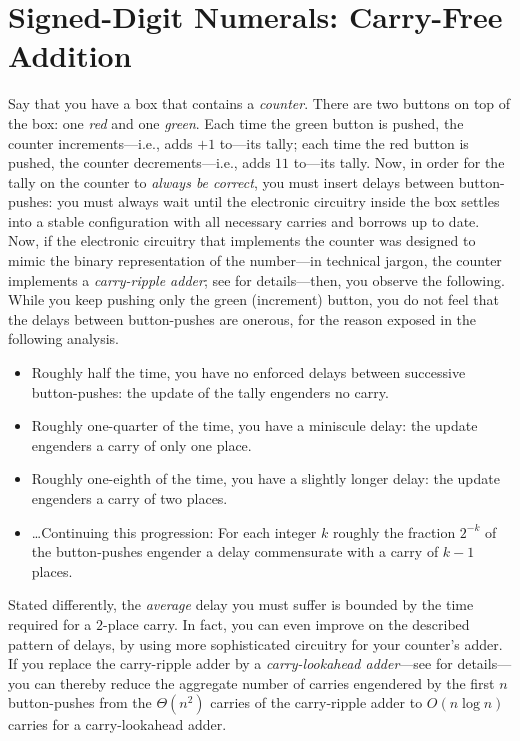 \chapter{Signed-Digit Numerals: Carry-Free Addition}
\label{ch:carry-free}

Say that you have a box that contains a {\it counter}.  There are two
buttons on top of the box: one {\em red} and one {\em green}.  Each
time the green button is pushed, the counter increments---i.e., adds
$+1$ to---its tally; each time the red button is pushed, the counter
decrements---i.e., adds $11$ to---its tally.  Now, in order for the
tally on the counter to {\em always be correct}, you must insert
delays between button-pushes: you must always wait until the
electronic circuitry inside the box settles into a stable
configuration with all necessary carries and borrows up to date.  Now,
if the electronic circuitry that implements the counter was designed
to mimic the binary representation of the number---in technical
jargon,  the counter implements a {\it
  carry-ripple adder}; see \cite{Hwang79} for details---then, you
observe the following.  While you keep pushing only the green
(increment) button, you do not feel that the delays between
button-pushes are onerous, for the reason exposed in the following
analysis.
\begin{itemize}
\item
Roughly half the time, you have no enforced delays between successive
button-pushes: the update of the tally engenders no carry.
\item
Roughly one-quarter of the time, you have a miniscule delay: the
update engenders a carry of only one place.
\item
Roughly one-eighth of the time, you have a slightly longer delay: the
update engenders a carry of two places.
\item
\ldots Continuing this progression: For each integer $k$ roughly the
fraction $2^{-k}$ of the button-pushes engender a delay commensurate
with a carry of $k-1$ places.
\end{itemize}
Stated differently, the {\em average} delay you must suffer is bounded
by the time required for a $2$-place carry.  In fact, you can even
improve on the described pattern of delays, by using more
sophisticated circuitry for your counter's adder.  If you replace the
carry-ripple adder by a {\it carry-lookahead adder}---see
\cite{Hwang79} for details---you can thereby reduce the aggregate
number of carries engendered by the first $n$ button-pushes from the
$\Theta(n^2)$ carries of the carry-ripple adder to $O(n \log n)$
carries for a carry-lookahead adder.

